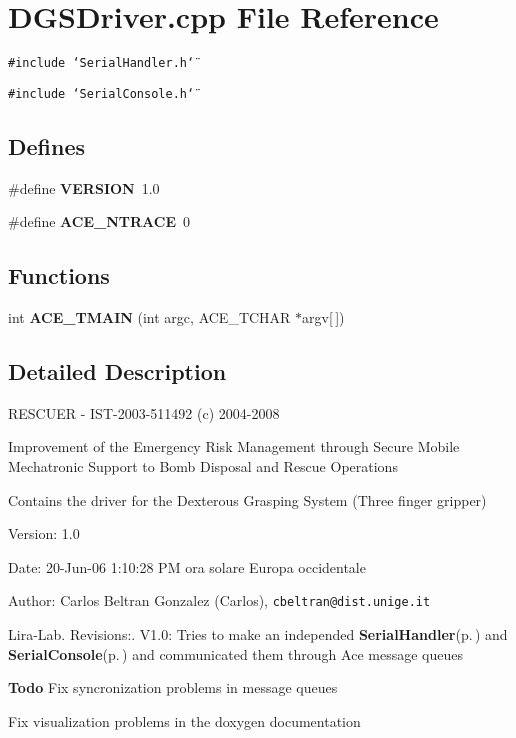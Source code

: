 \section{DGSDriver.cpp File Reference}
\label{DGSDriver_8cpp}
{\tt \#include \char`\"{}Serial\-Handler.h\char`\"{}}\par
{\tt \#include \char`\"{}Serial\-Console.h\char`\"{}}\par
\subsection*{Defines}
\begin{CompactItemize}
\item 
\#define {\bf VERSION}\ 1.0
\item 
\#define {\bf ACE\_\-NTRACE}\ 0
\end{CompactItemize}
\subsection*{Functions}
\begin{CompactItemize}
\item 
int {\bf ACE\_\-TMAIN} (int argc, ACE\_\-TCHAR $\ast$argv[$\,$])
\end{CompactItemize}


\subsection{Detailed Description}
RESCUER - IST-2003-511492 (c) 2004-2008

Improvement of the Emergency Risk Management through Secure Mobile Mechatronic Support to Bomb Disposal and Rescue Operations

Contains the driver for the Dexterous Grasping System (Three finger gripper) \begin{Desc}
\item[Version:]1.0 \end{Desc}
\begin{Desc}
\item[Date:]20-Jun-06 1:10:28 PM ora solare Europa occidentale \end{Desc}
\begin{Desc}
\item[Author:]Carlos Beltran Gonzalez (Carlos), {\tt cbeltran@dist.unige.it} 

Lira-Lab. Revisions:. V1.0: Tries to make an independed {\bf Serial\-Handler}{\rm (p.\,\pageref{classSerialHandler})} and {\bf Serial\-Console}{\rm (p.\,\pageref{classSerialConsole})} and communicated them through Ace message queues \end{Desc}
\begin{Desc}
\item[{\bf Todo}]Fix syncronization problems in message queues 

Fix visualization problems in the doxygen documentation \end{Desc}


